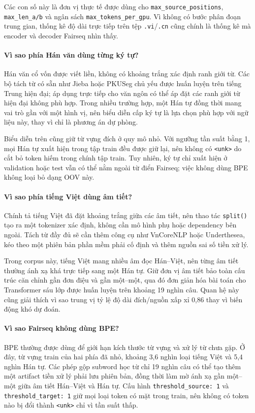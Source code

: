 \documentclass[11pt]{article}
\begin{document}
Các con số này là đơn vị thực tế được dùng cho
\texttt{max\_source\_positions}, \texttt{max\_len\_a/b} và ngân sách
\texttt{max\_tokens\_per\_gpu}. Vì không có bước phân đoạn trung gian, thống
kê độ dài trực tiếp trên tệp \texttt{.vi}/\texttt{.cn} cũng chính là thống kê
mà encoder và decoder Fairseq nhìn thấy.

\paragraph{Vì sao phía Hán văn dùng từng ký tự?}
Hán văn cổ vốn được viết liền, không có khoảng trắng xác định ranh giới từ.
Các bộ tách từ có sẵn như Jieba hoặc PKUSeg chủ yếu được huấn luyện trên tiếng
Trung hiện đại; áp dụng trực tiếp cho văn ngôn có thể áp đặt các ranh giới từ
hiện đại không phù hợp. Trong nhiều trường hợp, một Hán tự đồng thời mang vai
trò gần với một hình vị, nên biểu diễn cấp ký tự là lựa chọn phù hợp với ngữ
liệu này, thay vì chỉ là phương án dự phòng.

Biểu diễn trên cũng giữ từ vựng đích ở quy mô nhỏ. Với ngưỡng tần suất bằng 1,
mọi Hán tự xuất hiện trong tập train đều được giữ lại, nên không có
\texttt{<unk>} do cắt bỏ token hiếm trong chính tập train. Tuy nhiên, ký tự chỉ
xuất hiện ở validation hoặc test vẫn có thể nằm ngoài từ điển Fairseq; việc
không dùng BPE không loại bỏ dạng OOV này.

\paragraph{Vì sao phía tiếng Việt dùng âm tiết?}
Chính tả tiếng Việt đã đặt khoảng trắng giữa các âm tiết, nên thao tác
\texttt{split()} tạo ra một tokenizer xác định, không cần mô hình phụ hoặc
dependency bên ngoài. Tách từ đầy đủ sẽ cần thêm công cụ như VnCoreNLP hoặc
Underthesea, kéo theo một phiên bản phần mềm phải cố định và thêm nguồn sai số
tiền xử lý.

Trong corpus này, tiếng Việt mang nhiều âm đọc Hán--Việt, nên từng âm tiết
thường ánh xạ khá trực tiếp sang một Hán tự. Giữ đơn vị âm tiết bảo toàn cấu
trúc căn chỉnh gần đơn điệu và gần một--một, qua đó đơn giản hóa bài toán cho
Transformer sáu lớp được huấn luyện trên khoảng 19 nghìn câu. Quan hệ này cũng
giải thích vì sao trung vị tỷ lệ độ dài đích/nguồn xấp xỉ 0,86 thay vì biến
động khó dự đoán.

\paragraph{Vì sao Fairseq không dùng BPE?}
BPE thường được dùng để giới hạn kích thước từ vựng và xử lý từ chưa gặp. Ở
đây, từ vựng train của hai phía đã nhỏ, khoảng 3,6 nghìn loại tiếng Việt và
5,4 nghìn Hán tự. Các phép gộp subword học từ chỉ 19 nghìn câu có thể tạo thêm
một artifact tiền xử lý phải lưu phiên bản, đồng thời làm mờ ánh xạ gần
một--một giữa âm tiết Hán--Việt và Hán tự. Cấu hình
\texttt{threshold\_source: 1} và \texttt{threshold\_target: 1} giữ mọi loại
token có mặt trong train, nên không có token nào bị đổi thành \texttt{<unk>}
chỉ vì tần suất thấp.
\end{document}
